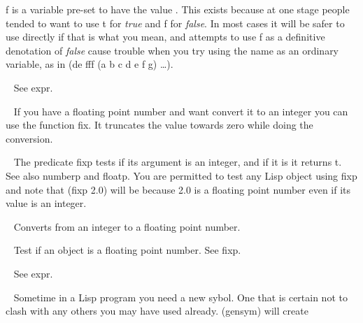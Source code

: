 \begin{description}
{\tx f} is a variable pre-set to have the value \nil. This exists because at
one stage people tended to want to use {\tx t} for {\em true} and {\tx f}
for {\em false}. In most cases it will be safer to use \nil{} directly if that
is what you mean, and attempts to use {\tx f} as a definitive denotation
of {\em false} cause trouble when you try using the name as an ordinary variable,
as in {\tx (de fff (a b c d e f g) \ldots)}.
\item[{\tx fexpr~~~~~~~~} \hspace{1cm} {\em symbol}]~\newline
See {\tx expr}.
\item[{\tx fix~~~~~~~~~~} \hspace{1cm} {\em function 1 arg}]~\newline
If you have a floating point number and want convert it to an integer you can
use the function {\tx fix}. It truncates the value towards zero while
doing the conversion.
\item[{\tx fixp~~~~~~~~~} \hspace{1cm} {\em function 1 arg}]~\newline
The predicate {\tx fixp} tests if its argument is an integer, and if it is
it returns {\tx t}. See also {\tx numberp} and {\tx floatp}. You are
permitted to test any Lisp object using {\tx fixp} and note that
{\tx (fixp 2.0)} will be \nil{} because 2.0 is a floating point number even
if its value is an integer.
\item[{\tx float~~~~~~~~} \hspace{1cm} {\em function 1 arg}]~\newline
Converts from an integer to a floating point number.
\item[{\tx floatp~~~~~~~} \hspace{1cm} {\em function 1 arg}]~\newline
Test if an object is a floating point number. See {\tx fixp}.
\item[{\tx fsubr~~~~~~~~} \hspace{1cm} {\em symbol}]~\newline
See {\tx expr}.
\item[{\tx gensym~~~~~~~} \hspace{1cm} {\em function 0 args}]~\newline
Sometime in a Lisp program you need a new sybol. One that is certain not to
clash with any others you may have used already. {\tx (gensym)} will create

\end{description}
